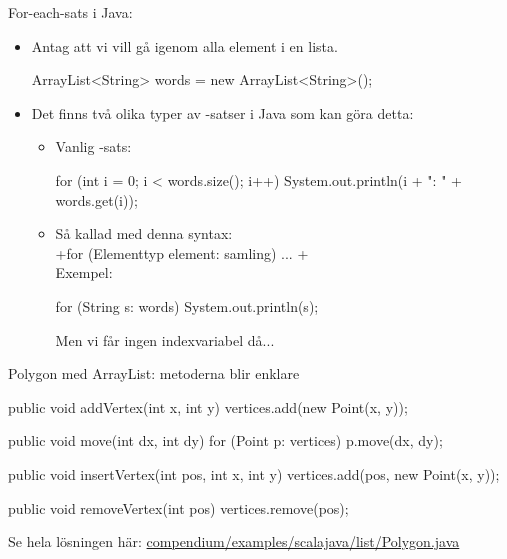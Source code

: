 \begin{Slide}{For-each-sats i Java:}\SlideFontSmall
\begin{itemize}
\item  Antag att vi vill gå igenom alla element i en lista.
\begin{Code}[numberstyle=,language=Java]
        ArrayList<String> words = new ArrayList<String>();
\end{Code}
\item Det finns två olika typer av -satser i Java som kan göra detta:
\begin{itemize}\SlideFontSmall
\item  Vanlig -sats:
\begin{Code}[numberstyle=,language=Java]
for (int i = 0; i < words.size(); i++) {
    System.out.println(i + ": " + words.get(i));
}
\end{Code}

\item  Så kallad  med denna syntax:\\
\jcode+for (Elementtyp element: samling) { ... }+ \\
\vspace{1em}Exempel:
\begin{Code}[numberstyle=,language=Java]
for (String s: words) {
    System.out.println(s);
}
\end{Code}
Men vi får ingen indexvariabel då...
\end{itemize}
\end{itemize}
\end{Slide}


\begin{Slide}{Polygon med ArrayList: metoderna blir enklare}
\begin{Code}[numberstyle=,language=Java]
    public void addVertex(int x, int y) {
        vertices.add(new Point(x, y));
    }

    public void move(int dx, int dy) {
        for (Point p: vertices){
            p.move(dx, dy);
        }
    }

    public void insertVertex(int pos, int x, int y) {
        vertices.add(pos, new Point(x, y));
    }

    public void removeVertex(int pos) {
        vertices.remove(pos);
    }
\end{Code}

Se hela lösningen här:
\href{https://github.com/lunduniversity/introprog/tree/master/compendium/examples/scalajava/list/Polygon.java}{compendium/examples/scalajava/list/Polygon.java}
\end{Slide}

